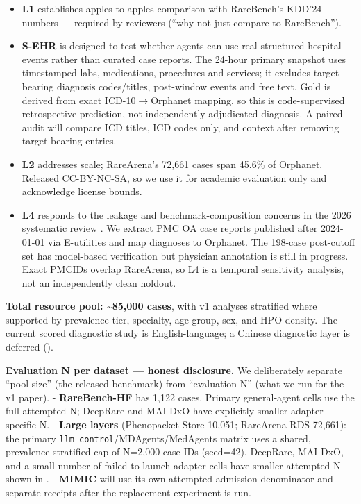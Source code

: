 \begin{itemize}
\tightlist
\item
  \textbf{L1} establishes apples-to-apples comparison with RareBench's KDD'24 numbers --- required by reviewers (``why not just compare to RareBench'').
\item
  \textbf{S-EHR} is designed to test whether agents can use real structured hospital events rather than curated case reports. The 24-hour primary snapshot uses timestamped labs, medications, procedures and services; it excludes target-bearing diagnosis codes/titles, post-window events and free text. Gold is derived from exact ICD-10\ensuremath{\rightarrow}Orphanet mapping, so this is code-supervised retrospective prediction, not independently adjudicated diagnosis. A paired audit will compare ICD titles, ICD codes only, and context after removing target-bearing entries.
\item
  \textbf{L2} addresses scale; RareArena's 72,661 cases span 45.6\% of Orphanet. Released CC-BY-NC-SA, so we use it for academic evaluation only and acknowledge license bounds.
\item
  \textbf{L4} responds to the leakage and benchmark-composition concerns in the
  2026 systematic review \citep{sysreview2026}. We extract PMC OA case reports
  published after 2024-01-01 via E-utilities and map diagnoses to Orphanet.
  The 198-case post-cutoff set has model-based verification but physician
  annotation is still in progress. Exact PMCIDs overlap RareArena, so L4 is a
  temporal sensitivity analysis, not an independently clean holdout.
\end{itemize}

\textbf{Total resource pool: \textasciitilde85,000 cases}, with v1 analyses stratified where
supported by prevalence tier, specialty, age group, sex, and HPO density. The
current scored diagnostic study is English-language; a Chinese diagnostic
layer is deferred ().

\textbf{Evaluation N per dataset --- honest disclosure.} We deliberately separate
``pool size'' (the released benchmark) from ``evaluation N'' (what we run for the
v1 paper).
- \textbf{RareBench-HF} has 1,122 cases. Primary general-agent cells use the full
attempted N; DeepRare and MAI-DxO have explicitly smaller adapter-specific N.
- \textbf{Large layers} (Phenopacket-Store 10,051; RareArena RDS 72,661): the primary
\texttt{llm\_control}/MDAgents/MedAgents matrix uses a shared, prevalence-stratified
cap of N=2,000 case IDs (seed=42). DeepRare, MAI-DxO, and a small number of
failed-to-launch adapter cells have smaller attempted N shown in .
- \textbf{MIMIC} will use its own attempted-admission denominator and separate
receipts after the replacement experiment is run.

